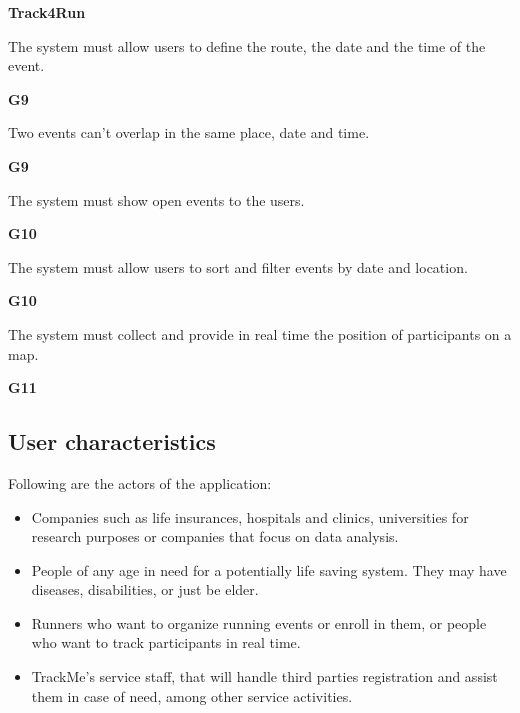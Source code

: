\documentclass[../main.tex]{subfiles}
\begin{document}
\begin{minipage}{\textwidth}
{\bf Track4Run}
\begin{description}
	\item [R11] The system must allow users to define the route, the date and the time of the event.
	\item \begin{flushright}{\bf{G9}}\end{flushright}

	\item [R12] Two events can't overlap in the same place, date and time.
	\item \begin{flushright}{\bf{G9}}\end{flushright}

	\item [R13] The system must show open events to the users.
	\item \begin{flushright}{\bf{G10}}\end{flushright}

	\item [R14] The system must allow users to sort and filter events by date and location.
	\item \begin{flushright}{\bf{G10}}\end{flushright}

	\item [R15] The system must collect and provide in real time the position of participants on a map.
	\item \begin{flushright}{\bf{G11}}\end{flushright}

\end{description}
\end{minipage}
\vspace{8mm}

\subsection{User characteristics}
Following are the actors of the application:
\begin{itemize}
	\item Companies such as life insurances, hospitals and clinics, universities for research purposes or companies that focus on data analysis.
	\item People of any age in need for a potentially life saving system. They may have diseases, disabilities, or just be elder.
	\item Runners who want to organize running events or enroll in them, or people who want to track participants in real time.
	\item TrackMe's service staff, that will handle third parties registration and assist them in case of need, among other service activities.
\end{itemize}
\end{document}
